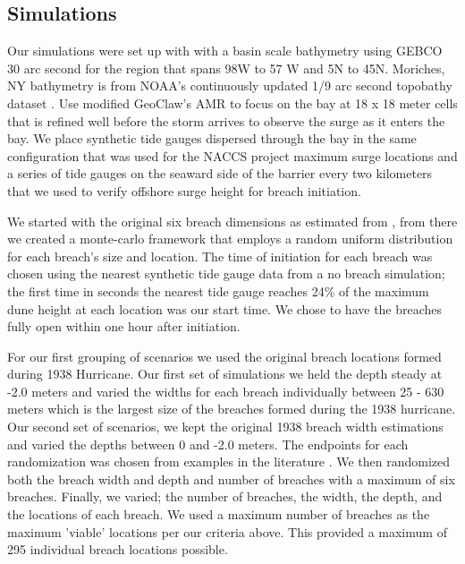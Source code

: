 \documentclass{coastal_paper}
\begin{document}
\subsection*{Simulations} 
Our simulations were set up with with a basin scale bathymetry using GEBCO 30 arc second \citep{weatherall2015new} for the region that spans 98W to 57 W and 5N to 45N. Moriches, NY bathymetry  is from NOAA's continuously updated 1/9 arc second topobathy dataset \citep{cires2014continuously}. Use modified GeoClaw's AMR to focus on the bay at 18 x 18 meter cells that is refined well before the storm arrives to observe the surge as it enters the bay. We place synthetic tide gauges dispersed through the bay in the same configuration that was used for the NACCS project maximum surge locations \citep{NACCS} and a series of tide gauges on the seaward side of the barrier every two kilometers that we used to verify offshore surge height for breach initiation.

We started with the original six breach dimensions as estimated from \citet{Canizares2008}, from there we created a monte-carlo framework that employs a random uniform distribution for each breach's size and location. The time of initiation for each breach was chosen using the nearest synthetic tide gauge data from a no breach simulation; the first time in seconds the nearest tide gauge reaches 24\% of the maximum dune height at each location was our start time. We chose to have the breaches fully open within one hour after initiation.

For our first grouping of scenarios we used the original breach locations formed during 1938 Hurricane. Our first set of simulations we held the depth steady at -2.0 meters and varied the widths for each breach individually between 25 - 630 meters which is the largest size of the breaches formed during the 1938 hurricane. Our second set of scenarios, we kept the original 1938 breach width estimations and varied the depths between 0 and -2.0 meters. The endpoints for each randomization was chosen from examples in the literature \citep{Schmeltz1983Breach/InletInlet., Kraus2003a,Visser1999, Canizares2008}. We then randomized both the breach width and depth and number of breaches with a maximum of six breaches. 
Finally, we varied; the number of breaches, the width, the depth, and the locations of each breach. We used a maximum number of breaches as the maximum 'viable' locations per our criteria above. This provided a maximum of 295 individual breach locations possible.
\end{document}
